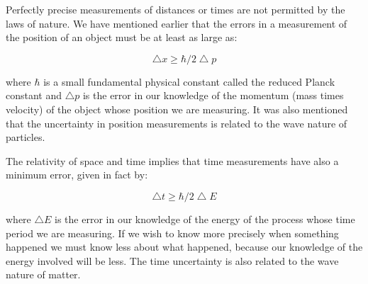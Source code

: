 \documentclass{article}
\begin{document}
	Perfectly precise measurements of distances or times are not permitted by the laws of nature. We have mentioned earlier that the errors in a measurement of the position of an object must be at least as large as:

	$$\bigtriangleup x \geq \hbar / 2 \bigtriangleup p $$

	where $\hbar$ is a small fundamental physical constant called the reduced Planck constant and $\bigtriangleup p$ is the error in our knowledge of the momentum (mass times velocity) of the object whose position we are measuring. It was also mentioned that the uncertainty in position measurements is related to the wave nature of particles.

	The relativity of space and time implies that time measurements have also a minimum error, given in fact by:

	$$\bigtriangleup t \geq \hbar / 2 \bigtriangleup E $$

	where $\bigtriangleup E$ is the error in our knowledge of the energy of the process whose time period we are measuring. If we wish to know more precisely when something happened we must know less about what happened, because our knowledge of the energy involved will be less. The time uncertainty is also related to the wave nature of matter. 
\end{document}
